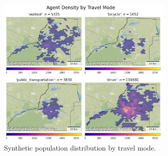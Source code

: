 \begin{figure}[htbp]
\centering
\includegraphics[width=85mm]{figures/2x2_agents_hex.png}
\caption{Synthetic population distribution by travel mode.}
\label{fig:2x2_agents_hex}
\end{figure}
